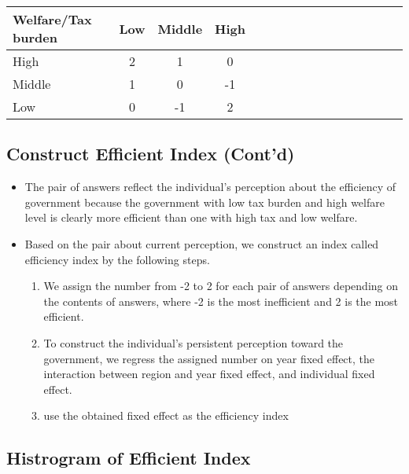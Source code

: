 \documentclass[ review  , 3p ]{elsarticle}
\providecommand{\tightlist}{%
  \setlength{\itemsep}{0pt}\setlength{\parskip}{0pt}}
\begin{document}
  \begin{table}[H]
  \centering\begingroup\fontsize{8}{10}\selectfont

  \begin{tabular}{l|cccl|cccl|cccl|ccc}
  \toprule
  Welfare/Tax burden & Low & Middle & High\\
  \midrule
  High & 2 & 1 & 0\\
  Middle & 1 & 0 & -1\\
  Low & 0 & -1 & 2\\
  \bottomrule
  \end{tabular}
  \endgroup{}
  \end{table}

  \hypertarget{construct-efficient-index-contd}{%
  \subsection{Construct Efficient Index (Cont'd)}\label{construct-efficient-index-contd}}

  \begin{itemize}
  \tightlist
  \item
    The pair of answers reflect the individual's perception about the efficiency of government because the government with low tax burden and high welfare level is clearly more efficient than one with high tax and low welfare.
  \item
    Based on the pair about current perception, we construct an index called efficiency index by the following steps.

    \begin{enumerate}
    \def\labelenumi{\arabic{enumi}.}
    \tightlist
    \item
      We assign the number from -2 to 2 for each pair of answers depending on the contents of answers, where -2 is the most inefficient and 2 is the most efficient.
    \item
      To construct the individual's persistent perception toward the government, we regress the assigned number on year fixed effect, the interaction between region and year fixed effect, and individual fixed effect.
    \item
      use the obtained fixed effect as the efficiency index
    \end{enumerate}
  \end{itemize}

  \hypertarget{histrogram-of-efficient-index}{%
  \subsection{Histrogram of Efficient Index}\label{histrogram-of-efficient-index}}
\end{document}
